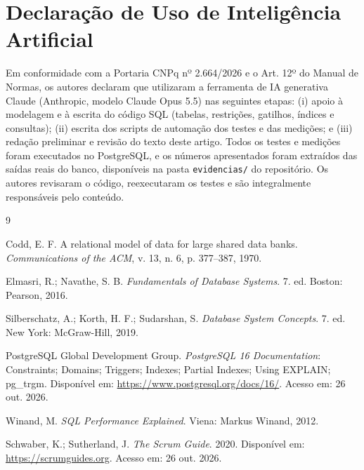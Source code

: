 \documentclass[a4paper,12pt]{article}
\newcommand{\cod}[1]{\texttt{\small #1}}
\begin{document}
\section*{Declaração de Uso de Inteligência Artificial}

Em conformidade com a Portaria CNPq nº 2.664/2026 e o Art. 12º do
Manual de Normas, os autores declaram que utilizaram a ferramenta de IA
generativa Claude (Anthropic, modelo Claude Opus 5.5) nas seguintes
etapas: (i) apoio à modelagem e à escrita do código SQL (tabelas,
restrições, gatilhos, índices e consultas); (ii) escrita dos scripts de
automação dos testes e das medições; e (iii) redação preliminar e
revisão do texto deste artigo. Todos os testes e medições foram
executados no PostgreSQL, e os números apresentados foram extraídos das
saídas reais do banco, disponíveis na pasta \cod{evidencias/} do
repositório. Os autores revisaram o código, reexecutaram os testes e são
integralmente responsáveis pelo conteúdo.

\begin{thebibliography}{9}

Codd, E. F.
\newblock A relational model of data for large shared data banks.
\newblock \emph{Communications of the ACM}, v. 13, n. 6, p. 377--387, 1970.

Elmasri, R.; Navathe, S. B.
\newblock \emph{Fundamentals of Database Systems}. 7. ed. Boston: Pearson, 2016.

Silberschatz, A.; Korth, H. F.; Sudarshan, S.
\newblock \emph{Database System Concepts}. 7. ed. New York: McGraw-Hill, 2019.

PostgreSQL Global Development Group.
\newblock \emph{PostgreSQL 16 Documentation}: Constraints; Domains;
Triggers; Indexes; Partial Indexes; Using EXPLAIN; pg\_trgm.
\newblock Disponível em: \url{https://www.postgresql.org/docs/16/}. Acesso em: 26 out. 2026.

Winand, M.
\newblock \emph{SQL Performance Explained}. Viena: Markus Winand, 2012.

Schwaber, K.; Sutherland, J.
\newblock \emph{The Scrum Guide}. 2020.
\newblock Disponível em: \url{https://scrumguides.org}. Acesso em: 26 out. 2026.

\end{thebibliography}
\end{document}
